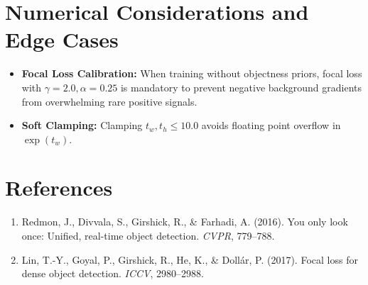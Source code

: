 \documentclass[11pt,a4paper]{article}
\theoremstyle{definition}
\begin{document}
\section{Numerical Considerations and Edge Cases}

\begin{itemize}
    \item \textbf{Focal Loss Calibration:} When training without objectness priors, focal loss with $\gamma = 2.0, \alpha = 0.25$ is mandatory to prevent negative background gradients from overwhelming rare positive signals.
    \item \textbf{Soft Clamping:} Clamping $t_w, t_h \le 10.0$ avoids floating point overflow in $\exp(t_w)$.
\end{itemize}

\section{References}
\begin{enumerate}
    \item Redmon, J., Divvala, S., Girshick, R., \& Farhadi, A. (2016). You only look once: Unified, real-time object detection. \emph{CVPR}, 779--788.
    \item Lin, T.-Y., Goyal, P., Girshick, R., He, K., \& Doll{\'a}r, P. (2017). Focal loss for dense object detection. \emph{ICCV}, 2980--2988.
\end{enumerate}
\end{document}
